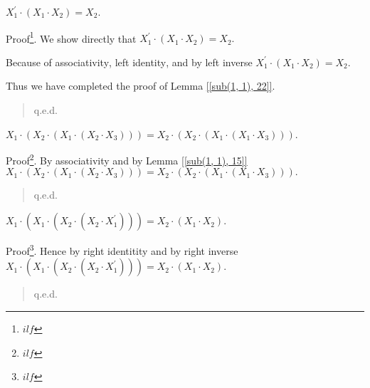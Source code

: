 \documentclass[a4]{article}
\newenvironment{ilfproof}[1]{%
Proof\/\footnote{#1}.}{\begin{quote}\raggedleft q.e.d.\end{quote}}
\begin{document}
\begin{Lemma}\label{[sub(1, 1), 22]}

$ X_{1} ^{\prime}  \cdot  (X_{1} \cdot  X_{2}) = X_{2} $.

\end{Lemma}



\begin{ilfproof}{$ ilf $} We  show directly that $ X_{1} ^{\prime}  \cdot  (X_{1} \cdot  X_{2}) = X_{2}. $

Because of $ $associativity$ $,  $ $left identity$ $, and by $ $left inverse$ $ $ X_{1} ^{\prime}  \cdot  (X_{1} \cdot  X_{2}) = X_{2}. $

Thus we have completed the proof of Lemma \ref{[sub(1, 1), 22]}.







\end{ilfproof}

\begin{Lemma}\label{[sub(1, 1), 24]}

$ X_{1} \cdot  (X_{2} \cdot  (X_{1} \cdot  (X_{2} \cdot  X_{3}))) = X_{2} \cdot  (X_{2} \cdot  (X_{1} \cdot  (X_{1} \cdot  X_{3}))) $.

\end{Lemma}



\begin{ilfproof}{$ ilf $} By $ $associativity$ $ and by Lemma \ref{[sub(1, 1), 15]} $ X_{1} \cdot  (X_{2} \cdot  (X_{1} \cdot  (X_{2} \cdot  X_{3}))) = X_{2} \cdot  (X_{2} \cdot  (X_{1} \cdot  (X_{1} \cdot  X_{3}))). $





\end{ilfproof}

\begin{Lemma}\label{[sub(1, 1), 27]}

$ X_{1} \cdot  (X_{1} \cdot  (X_{2} \cdot  (X_{2} \cdot  X_{1} ^{\prime} ))) = X_{2} \cdot  (X_{1} \cdot  X_{2}) $.

\end{Lemma}



\begin{ilfproof}{$ ilf $} Hence by $ $right identitity$ $ and by $ $right inverse$ $ $ X_{1} \cdot  (X_{1} \cdot  (X_{2} \cdot  (X_{2} \cdot  X_{1} ^{\prime} ))) = X_{2} \cdot  (X_{1} \cdot  X_{2}). $





\end{ilfproof}
\end{document}
